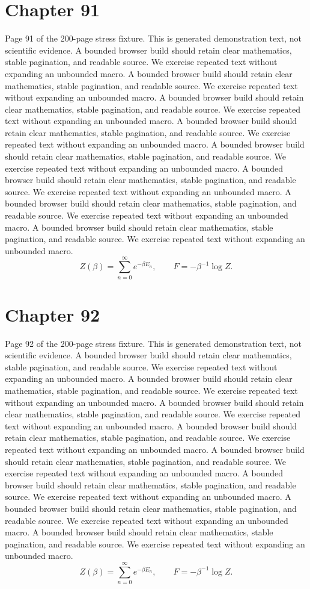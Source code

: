 \documentclass[11pt]{article}
\begin{document}
\section*{Chapter 91}
Page 91 of the 200-page stress fixture. This is generated demonstration text, not scientific evidence.
A bounded browser build should retain clear mathematics, stable pagination, and readable source. We exercise repeated text without expanding an unbounded macro.
A bounded browser build should retain clear mathematics, stable pagination, and readable source. We exercise repeated text without expanding an unbounded macro.
A bounded browser build should retain clear mathematics, stable pagination, and readable source. We exercise repeated text without expanding an unbounded macro.
A bounded browser build should retain clear mathematics, stable pagination, and readable source. We exercise repeated text without expanding an unbounded macro.
A bounded browser build should retain clear mathematics, stable pagination, and readable source. We exercise repeated text without expanding an unbounded macro.
A bounded browser build should retain clear mathematics, stable pagination, and readable source. We exercise repeated text without expanding an unbounded macro.
A bounded browser build should retain clear mathematics, stable pagination, and readable source. We exercise repeated text without expanding an unbounded macro.
A bounded browser build should retain clear mathematics, stable pagination, and readable source. We exercise repeated text without expanding an unbounded macro.
\[Z(\beta)=\sum_{n=0}^{\infty}e^{-\beta E_n},\qquad F=-\beta^{-1}\log Z.\]
\newpage
\section*{Chapter 92}
Page 92 of the 200-page stress fixture. This is generated demonstration text, not scientific evidence.
A bounded browser build should retain clear mathematics, stable pagination, and readable source. We exercise repeated text without expanding an unbounded macro.
A bounded browser build should retain clear mathematics, stable pagination, and readable source. We exercise repeated text without expanding an unbounded macro.
A bounded browser build should retain clear mathematics, stable pagination, and readable source. We exercise repeated text without expanding an unbounded macro.
A bounded browser build should retain clear mathematics, stable pagination, and readable source. We exercise repeated text without expanding an unbounded macro.
A bounded browser build should retain clear mathematics, stable pagination, and readable source. We exercise repeated text without expanding an unbounded macro.
A bounded browser build should retain clear mathematics, stable pagination, and readable source. We exercise repeated text without expanding an unbounded macro.
A bounded browser build should retain clear mathematics, stable pagination, and readable source. We exercise repeated text without expanding an unbounded macro.
A bounded browser build should retain clear mathematics, stable pagination, and readable source. We exercise repeated text without expanding an unbounded macro.
\[Z(\beta)=\sum_{n=0}^{\infty}e^{-\beta E_n},\qquad F=-\beta^{-1}\log Z.\]
\newpage
\end{document}
